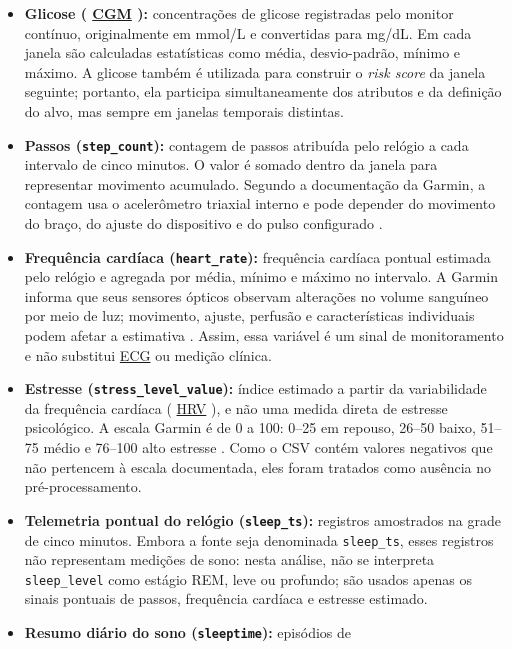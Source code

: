 \documentclass[12pt,a4paper]{article}
\DeclareRobustCommand{\sigla}[1]{%
    \texorpdfstring{\hyperlink{sigla:#1}{#1}}{#1}%
}
\begin{document}
\begin{itemize}
    \item \textbf{Glicose (\sigla{CGM}):} concentrações de glicose registradas pelo
    monitor contínuo, originalmente em mmol/L e convertidas para mg/dL. Em cada
    janela são calculadas estatísticas como média, desvio-padrão, mínimo e
    máximo. A glicose também é utilizada para construir o \textit{risk score}
    da janela seguinte; portanto, ela participa simultaneamente dos atributos
    e da definição do alvo, mas sempre em janelas temporais distintas.
    \item \textbf{Passos (\texttt{step\_count}):} contagem de passos atribuída
    pelo relógio a cada intervalo de cinco minutos. O valor é somado dentro da
    janela para representar movimento acumulado. Segundo a documentação da
    Garmin, a contagem usa o acelerômetro triaxial interno e pode depender do
    movimento do braço, do ajuste do dispositivo e do pulso configurado
    \cite{garminsteps2026}.
    \item \textbf{Frequência cardíaca (\texttt{heart\_rate}):} frequência
    cardíaca pontual estimada pelo relógio e agregada por média, mínimo e máximo
    no intervalo. A Garmin informa que seus sensores ópticos observam alterações
    no volume sanguíneo por meio de luz; movimento, ajuste, perfusão e
    características individuais podem afetar a estimativa
    \cite{garminhr2026}. Assim, essa variável é um sinal de monitoramento e não
    substitui \sigla{ECG} ou medição clínica.
    \item \textbf{Estresse (\texttt{stress\_level\_value}):} índice estimado a
    partir da variabilidade da frequência cardíaca (\sigla{HRV}), e não uma medida
    direta de estresse psicológico. A escala Garmin é de 0 a 100: 0--25 em
    repouso, 26--50 baixo, 51--75 médio e 76--100 alto estresse
    \cite{garminstress2026}. Como o CSV contém valores negativos que não
    pertencem à escala documentada, eles foram tratados como ausência no
    pré-processamento.
    \item \textbf{Telemetria pontual do relógio (\texttt{sleep\_ts}):} registros
    amostrados na grade de cinco minutos. Embora a fonte seja denominada
    \texttt{sleep\_ts}, esses registros não representam medições de sono:
    nesta análise, não se interpreta \texttt{sleep\_level} como estágio REM,
    leve ou profundo; são usados apenas os sinais pontuais de passos,
    frequência cardíaca e estresse estimado.
    \item \textbf{Resumo diário do sono (\texttt{sleeptime}):} episódios de

\end{itemize}
\end{document}
